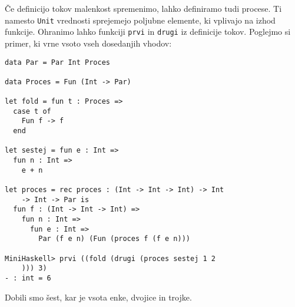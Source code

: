 \documentclass[12pt,a4paper,openany]{book}
\begin{document}
Če definicijo tokov malenkost spremenimo, lahko definiramo tudi procese. Ti namesto \lstinline{Unit} vrednosti sprejemejo poljubne elemente, ki 
vplivajo na izhod funkcije. Ohranimo lahko funkciji \lstinline{prvi} in \lstinline{drugi} iz definicije tokov. Poglejmo si primer, ki vrne vsoto 
vseh dosedanjih vhodov:
\begin{lstlisting}
data Par = Par Int Proces

data Proces = Fun (Int -> Par)

let fold = fun t : Proces =>
  case t of
    Fun f -> f
  end

let sestej = fun e : Int =>
  fun n : Int =>
    e + n

let proces = rec proces : (Int -> Int -> Int) -> Int 
    -> Int -> Par is
  fun f : (Int -> Int -> Int) =>
    fun n : Int =>
      fun e : Int =>
        Par (f e n) (Fun (proces f (f e n)))
  
MiniHaskell> prvi ((fold (drugi (proces sestej 1 2
    ))) 3)
- : int = 6
\end{lstlisting}
Dobili smo šest, kar je vsota enke, dvojice in trojke.

\newpage


\appendix

\newpage


\label{stran_literatura}
 
\end{document}
